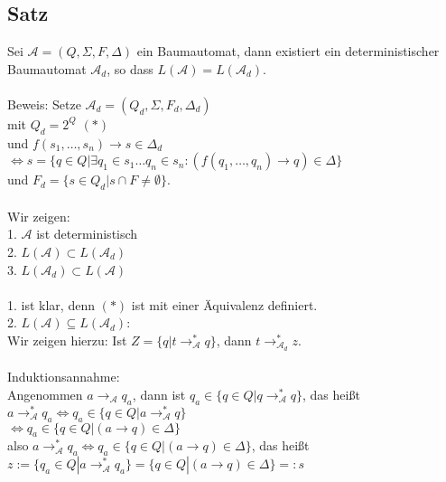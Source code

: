 \documentclass[titlepage]{article}
\begin{document}
\subsection{Satz}

Sei $\mathcal{A} = (Q, \Sigma, F, \Delta)$ ein Baumautomat, dann existiert ein 
deterministischer Baumautomat $\mathcal{A}_d$, 
so dass $L(\mathcal{A}) = L(\mathcal{A}_d)$.\\ \\

Beweis: Setze $\mathcal{A}_d = (Q_d, \Sigma, F_d, \Delta_d)$ \\
mit $Q_d = 2^Q$ $(\ast)$\\
und $f(s_1, \dots, s_n) \rightarrow s \in \Delta_d$\\
$\Leftrightarrow s = \{ q \in Q | \exists q_1 \in s_1 \dots q_n \in s_n: 
(f(q_1, \dots, q_n) \rightarrow q) \in \Delta\}$ \\
und $F_d = \{ s \in Q_d | s \cap F \neq \emptyset\}$.\\ \\
Wir zeigen:\\
1. $\mathcal{A}$ ist deterministisch \\
2. $L(\mathcal{A}) \subset L(\mathcal{A}_d)$ \\
3. $L(\mathcal{A}_d) \subset L(\mathcal{A})$ \\ \\

1. ist klar, denn $(\ast)$ ist mit einer \"Aquivalenz definiert.\\
2. \glqq$L(\mathcal{A}) \subseteq L(\mathcal{A}_d)$\grqq:\\

Wir zeigen hierzu: Ist $Z = \{ q | t \rightarrow ^\ast_\mathcal{A} q\}$, 
dann $ t \rightarrow ^\ast_{\mathcal{A}_d} z$.\\ \\

Induktionsannahme:\\
Angenommen $a \rightarrow _\mathcal{A} q_a$, dann ist 
$q_a \in \{ q \in Q | q \rightarrow ^\ast_\mathcal{A} q\}$, das hei\ss t\\
$a \rightarrow ^\ast_\mathcal{A} q_a \Leftrightarrow q_a \in 
\{ q \in Q | a \rightarrow ^\ast_\mathcal{A} q \}$\\
$\Leftrightarrow q_a \in \{ q \in Q | (a \rightarrow q) \in \Delta \}$\\
also $a \rightarrow ^\ast_\mathcal{A} q_a \Leftrightarrow q_a \in 
\{ q \in Q | (a \rightarrow q) \in \Delta \}$, das hei\ss t\\
$z := \{ q_a \in Q | a \rightarrow ^\ast_\mathcal{A} q_a \} = 
\{ q \in Q | (a \rightarrow q) \in \Delta \} =: s$\\
\end{document}
